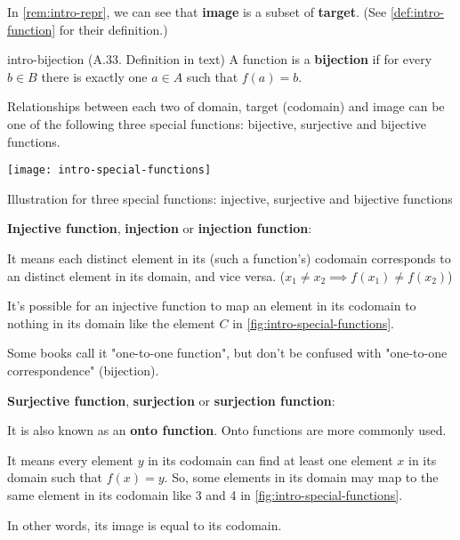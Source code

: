 \documentclass[../src/handouts/main.tex]{subfiles}
\begin{document}
In \cref{rem:intro-repr}, we can see that \textbf{image} is a subset of \textbf{target}. (See \cref{def:intro-function} for their definition.)

\begin{definition}{}{intro-bijection}
  (A.33. Definition in text)
  A function {} is a \textbf{bijection} if for every $b \in B$ there is exactly one $a \in A$ such that $f(a) = b$.
\end{definition}

Relationships between each two of domain, target (codomain) and image can be one of the following three special functions: bijective, surjective and bijective functions.

\begin{reusablefigure}
  \centering
  \texttt{[image: intro-special-functions]}
  \caption{Illustration for three special functions: injective, surjective and bijective functions}
  \label{fig:intro-special-functions}
\end{reusablefigure}

\vspace{.5em}
\textbf{Injective function}, \textbf{injection} or \textbf{injection function}:
\begin{enumerate*}
  \item It means each distinct element in its (such a function's) codomain corresponds to an distinct element in its domain, and vice versa. ($x_1 \neq x_2 \implies f(x_1) \neq f(x_2)$)
  \item It's possible for an injective function to map an element in its codomain to nothing in its domain like the element $C$ in \cref{fig:intro-special-functions}.
  \item Some books call it "one-to-one function", but don't be confused with "one-to-one correspondence" (bijection).
\end{enumerate*}

\vspace{.5em}
\textbf{Surjective function}, \textbf{surjection} or \textbf{surjection function}:
\begin{enumerate*}
  \item It is also known as an \textbf{onto function}. Onto functions are more commonly used.
  \item It means every element $y$ in its codomain can find at least one element $x$ in its domain such that $f(x) = y$. So, some elements in its domain may map to the same element in its codomain like 3 and 4 in \cref{fig:intro-special-functions}.
  \item In other words, its image is equal to its codomain.
\end{enumerate*}
\end{document}
